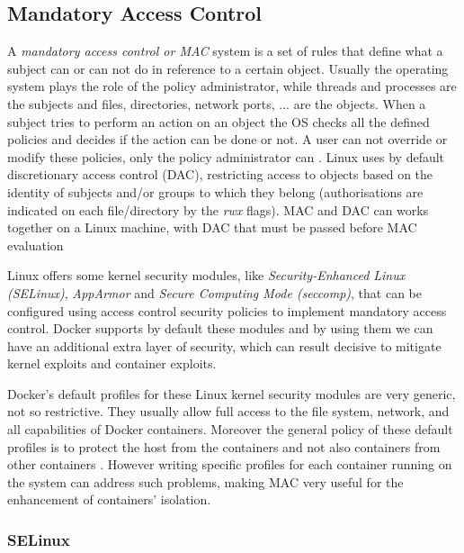 \documentclass[a4paper,12pt]{article}
\begin{document}
\subsection{Mandatory Access Control}

A \textit{mandatory access control or MAC} system is a set of rules that define
what a subject can or can not do in reference to a certain object. Usually the
operating system plays the role of the policy administrator, while threads and
processes are the subjects and files, directories, network ports, ... are the
objects. When a subject tries to perform an action on an object the OS checks
all the defined policies and decides if the action can be done or not. A user
can not override or modify these policies, only the policy administrator
can \cite{wiki_MAC}. Linux uses by default discretionary access control (DAC),
restricting access to objects based on the identity of subjects and/or groups to
which they belong (authorisations are indicated on each file/directory by the
\textit{rwx} flags). MAC and DAC can works together on a Linux machine, with DAC
that must be passed before MAC evaluation \par Linux offers some kernel security
modules, like \textit{Security-Enhanced Linux (SELinux)}, \textit{AppArmor} and
\textit{Secure Computing Mode (seccomp)}, that can be configured using access
control security policies to implement mandatory access control. Docker supports
by default these modules and by using them we can have an additional extra layer
of security, which can result decisive to mitigate kernel exploits and container
exploits. \par Docker's default profiles for these Linux kernel security modules
are very generic, not so restrictive. They usually allow full access to the
file system, network, and all capabilities of Docker containers. Moreover the
general policy of these default profiles is to protect the host from the
containers and not also containers from other
containers \cite{to_docker_or_not_to_docker}. However writing specific profiles
for each container running on the system can address such problems, making MAC
very useful for the enhancement of containers' isolation.

\subsubsection{SELinux}
\end{document}
